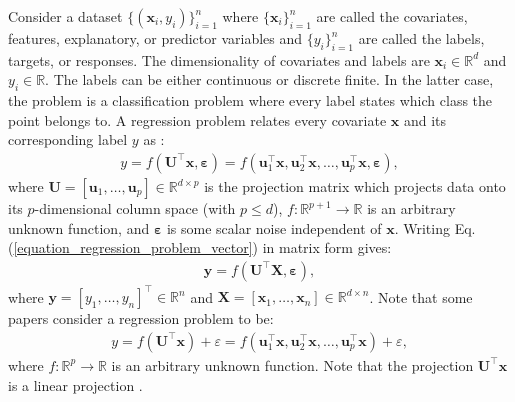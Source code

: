 \documentclass[lang=cn,10pt]{gorgeousnbook}
\numberwithin{equation}{section}%
\numberwithin{figure}{section}%
\begin{document}
\begin{definition}
Consider a dataset $\{(\boldsymbol{x}_i, y_i)\}_{i=1}^n$ where $\{\boldsymbol{x}_i\}_{i=1}^n$ are called the covariates, features, explanatory, or predictor variables and $\{y_i\}_{i=1}^n$ are called the labels, targets, or responses. 
The dimensionality of covariates and labels are $\boldsymbol{x}_i \in \mathbb{R}^d$ and $y_i \in \mathbb{R}$. 
The labels can be either continuous or discrete finite. In the latter case, the problem is a classification problem where every label states which class the point belongs to. 
A regression problem relates every covariate $\boldsymbol{x}$ and its corresponding label $y$ as \cite{li1991sliced}:
\begin{align}\label{equation_regression_problem_vector}
y = f(\boldsymbol{U}^\top \boldsymbol{x}, \boldsymbol{\varepsilon}) = f(\boldsymbol{u}_1^\top \boldsymbol{x}, \boldsymbol{u}_2^\top \boldsymbol{x}, \dots, \boldsymbol{u}_p^\top \boldsymbol{x}, \boldsymbol{\varepsilon}),
\end{align}
where $\boldsymbol{U} = [\boldsymbol{u}_1, \dots, \boldsymbol{u}_p] \in \mathbb{R}^{d \times p}$ is the projection matrix which projects data onto its $p$-dimensional column space (with $p \leq d$), $f: \mathbb{R}^{p+1} \rightarrow \mathbb{R}$ is an arbitrary unknown function, and $\boldsymbol{\varepsilon}$ is some scalar noise independent of $\boldsymbol{x}$.
Writing Eq. (\ref{equation_regression_problem_vector}) in matrix form gives:
\begin{align}\label{equation_regression_problem_matrix}
\boldsymbol{y} = f(\boldsymbol{U}^\top \boldsymbol{X}, \boldsymbol{\varepsilon}),
\end{align}
where $\boldsymbol{y} = [y_1, \dots, y_n]^\top \in \mathbb{R}^n$ and $\boldsymbol{X} = [\boldsymbol{x}_1, \dots, \boldsymbol{x}_n] \in \mathbb{R}^{d \times n}$.
Note that some papers consider a regression problem to be:
\begin{align}\label{equation_regression_problem_vector_2}
y = f(\boldsymbol{U}^\top \boldsymbol{x}) + \varepsilon = f(\boldsymbol{u}_1^\top \boldsymbol{x}, \boldsymbol{u}_2^\top \boldsymbol{x}, \dots, \boldsymbol{u}_p^\top \boldsymbol{x}) + \varepsilon,
\end{align}
where $f: \mathbb{R}^{p} \rightarrow \mathbb{R}$ is an arbitrary unknown function.
Note that the projection $\boldsymbol{U}^\top \boldsymbol{x}$ is a linear projection \cite{cunningham2015linear}.
\end{definition}
\end{document}
